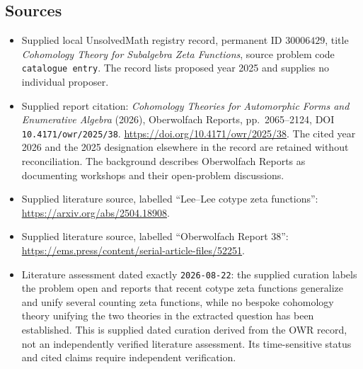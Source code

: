 \documentclass[11pt]{article}
\begin{document}
\subsection{Sources}
\begin{itemize}
\item Supplied local UnsolvedMath registry record, permanent ID \(30006429\), title \emph{Cohomology Theory for Subalgebra Zeta Functions}, source problem code \texttt{catalogue entry}. The record lists proposed year 2025 and supplies no individual proposer.
\item Supplied report citation: \emph{Cohomology Theories for Automorphic Forms and Enumerative Algebra} (2026), Oberwolfach Reports, pp.\ 2065--2124, DOI \texttt{10.4171/owr/2025/38}. \url{https://doi.org/10.4171/owr/2025/38}. The cited year 2026 and the 2025 designation elsewhere in the record are retained without reconciliation. The background describes Oberwolfach Reports as documenting workshops and their open-problem discussions.
\item Supplied literature source, labelled ``Lee--Lee cotype zeta functions'': \url{https://arxiv.org/abs/2504.18908}.
\item Supplied literature source, labelled ``Oberwolfach Report 38'': \url{https://ems.press/content/serial-article-files/52251}.
\item Literature assessment dated exactly \texttt{2026-08-22}: the supplied curation labels the problem open and reports that recent cotype zeta functions generalize and unify several counting zeta functions, while no bespoke cohomology theory unifying the two theories in the extracted question has been established. This is supplied dated curation derived from the OWR record, not an independently verified literature assessment. Its time-sensitive status and cited claims require independent verification.
\end{itemize}
\end{document}
